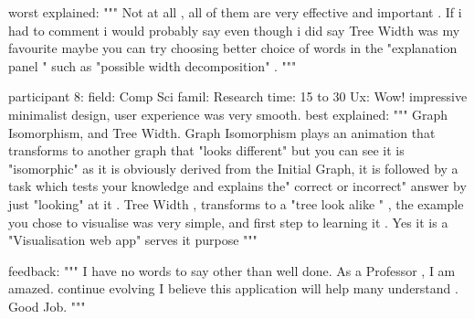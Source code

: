    worst explained:
      """
      Not at all , all of them are very effective and important . If i had to
      comment i would probably say even though i did say Tree Width was my
      favourite maybe you can try choosing better choice of words in the
      "explanation panel " such as "possible width decomposition" .
      """

participant 8:
   field: Comp Sci
   famil: Research
   time: 15 to 30
   Ux: Wow! impressive minimalist design, user experience was very smooth.
   best explained:
      """ Graph Isomorphism, and Tree Width. Graph Isomorphism plays an
      animation that transforms to another graph that "looks different" but you
      can see it is "isomorphic" as it is obviously derived from the Initial
      Graph, it is followed by a task which tests your knowledge and explains
      the" correct or incorrect" answer by just "looking" at it . Tree Width ,
      transforms to a "tree look alike " , the example you chose to visualise
      was very simple, and first step to learning it . Yes it is a
      "Visualisation web app" serves it purpose """

  feedback:
      """
      I have no words to say other than well done. As a Professor , I am
      amazed. continue evolving I believe this application will help many
      understand . Good Job.
      """
